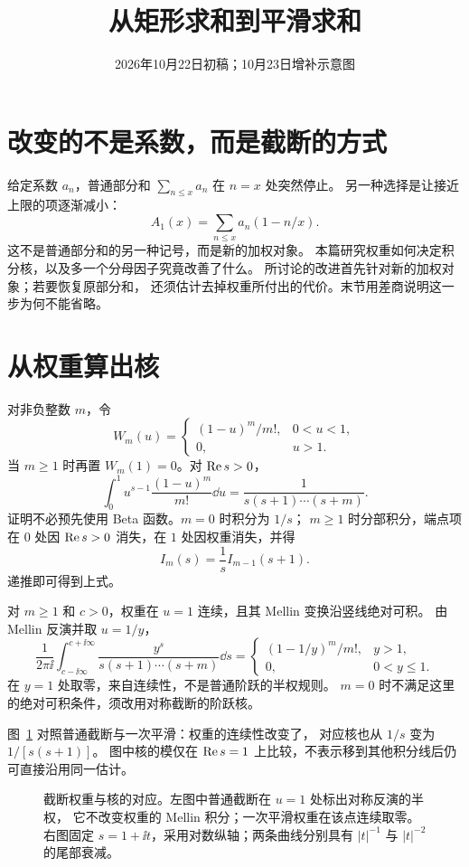 \documentclass[UTF8,fontset=fandol,11pt]{ctexart}
\date{2026年10月22日初稿；10月23日增补示意图}
\title{从矩形求和到平滑求和}
\begin{document}
\maketitle
\draftnotice
\section{改变的不是系数，而是截断的方式}
给定系数 $a_n$，普通部分和 $\sum_{n\le x}a_n$ 在 $n=x$ 处突然停止。
另一种选择是让接近上限的项逐渐减小：
\[
 A_1(x)=\sum_{n\le x}a_n(1-n/x).
\]
这不是普通部分和的另一种记号，而是新的加权对象。
本篇研究权重如何决定积分核，以及多一个分母因子究竟改善了什么。
所讨论的改进首先针对新的加权对象；若要恢复原部分和，
还须估计去掉权重所付出的代价。末节用差商说明这一步为何不能省略。

\section{从权重算出核}
对非负整数 $m$，令
\[
 W_m(u)=
 \begin{cases}(1-u)^m/m!,&0<u<1,\\0,&u>1.\end{cases}
\]
当 $m\ge1$ 时再置 $W_m(1)=0$。对 $\operatorname{Re} s>0$，
\[
 \int_0^1u^{s-1}\frac{(1-u)^m}{m!}\dd u
 =\frac1{s(s+1)\cdots(s+m)}.
\]
证明不必预先使用 Beta 函数。$m=0$ 时积分为 $1/s$；
$m\ge1$ 时分部积分，端点项在 $0$ 处因 $\operatorname{Re} s>0$ 消失，在 $1$ 处因权重消失，并得
\[
 I_m(s)=\frac1s I_{m-1}(s+1).
\]
递推即可得到上式。

对 $m\ge1$ 和 $c>0$，权重在 $u=1$ 连续，且其 Mellin 变换沿竖线绝对可积。
由 Mellin 反演并取 $u=1/y$，
\[
 \frac1{2\pi\ii}\int_{c-\ii\infty}^{c+\ii\infty}
 \frac{y^s}{s(s+1)\cdots(s+m)}\dd s
 =
 \begin{cases}
 (1-1/y)^m/m!,&y>1,\\
 0,&0<y\le1.
 \end{cases}
\]
在 $y=1$ 处取零，来自连续性，不是普通阶跃的半权规则。
$m=0$ 时不满足这里的绝对可积条件，须改用对称截断的阶跃核。

图~\ref{fig:smoothing-kernels} 对照普通截断与一次平滑：权重的连续性改变了，
对应核也从 $1/s$ 变为 $1/[s(s+1)]$。
图中核的模仅在 $\operatorname{Re} s=1$ 上比较，不表示移到其他积分线后仍可直接沿用同一估计。
\begin{figure}[htbp]
\centering

\caption{截断权重与核的对应。左图中普通截断在 $u=1$ 处标出对称反演的半权，
它不改变权重的 Mellin 积分；一次平滑权重在该点连续取零。
右图固定 $s=1+\ii t$，采用对数纵轴；两条曲线分别具有
$|t|^{-1}$ 与 $|t|^{-2}$ 的尾部衰减。}
\label{fig:smoothing-kernels}
\end{figure}
\end{document}
